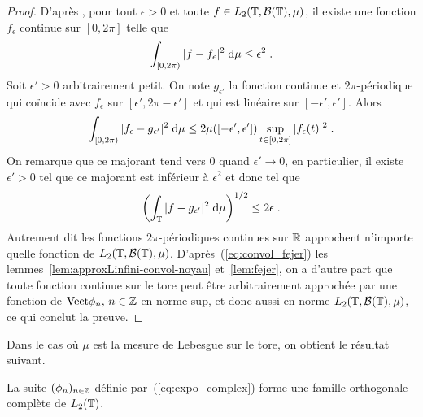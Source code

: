 \begin{proof}\smartqed
  D'apr\`{e}s \cite[proposition~8 du chapitre~6, page~128]{royden:1988}, pour tout
  $\epsilon>0$ et toute $f\in L_2(\mathbb{T},\mathcal{B}(\mathbb{T}),\mu)$, il existe une
  fonction $f_\epsilon$ continue sur $[0,2\pi]$ telle que
$$
\int_{[0,2\pi)}|f-f_\epsilon|^2\;\mathrm{d}\mu \leq \epsilon^2 \;.
$$
Soit $\epsilon'>0$ arbitrairement petit. On note $g_{\epsilon'}$ la fonction
continue et $2\pi$-p\'{e}riodique qui co\"{i}ncide avec $f_\epsilon$ sur
$[\epsilon',2\pi-\epsilon']$ et qui est lin\'{e}aire sur
$[-\epsilon',\epsilon']$. Alors
$$
\int_{[0,2\pi)}|f_\epsilon-g_{\epsilon'}|^2\;\mathrm{d}\mu \leq
2 \mu([-\epsilon',\epsilon']) \sup_{t\in[0,2\pi]}|f_\epsilon(t)|^2 \;.
$$
On remarque que ce majorant tend vers 0 quand $\epsilon'\to0$, en particulier,
il existe $\epsilon'>0$ tel que ce majorant est inf\'{e}rieur \`{a} $\epsilon^2$ et
donc tel que
$$
\left(\int_{\mathbb{T}}|f-g_{\epsilon'}|^2\;\mathrm{d}\mu\right)^{1/2} \leq 2\epsilon \;.
$$
Autrement dit les fonctions $2\pi$-p\'{e}riodiques continues sur $\mathbb{R}$ approchent
n'importe quelle fonction de $L_2(\mathbb{T},\mathcal{B}(\mathbb{T}),\mu)$.
D'apr\`{e}s~(\ref{eq:convol_fejer}) les lemmes~\ref{lem:approxLinfini-convol-noyau}
et~\ref{lem:fejer}, on a d'autre part que toute fonction continue sur le tore
peut \^{e}tre arbitrairement approch\'{e}e par une fonction de
$\mathrm{Vect}{\phi_n,\,n\in\mathbb{Z}}$ en norme sup, et donc aussi en norme
$L_2(\mathbb{T},\mathcal{B}(\mathbb{T}),\mu)$, ce qui conclut la preuve.

\end{proof}


Dans le cas o\`{u} $\mu$ est la mesure de Lebesgue sur le tore, on obtient le
r\'{e}sultat suivant.
\begin{corollary}
\label{cor:completude-base-l2}
La suite $(\phi_n)_{n\in\mathbb{Z}}$ d\'{e}finie par~(\ref{eq:expo_complex})
forme une famille orthogonale compl\`{e}te de $L_2(\mathbb{T})$.
\end{corollary}

%

